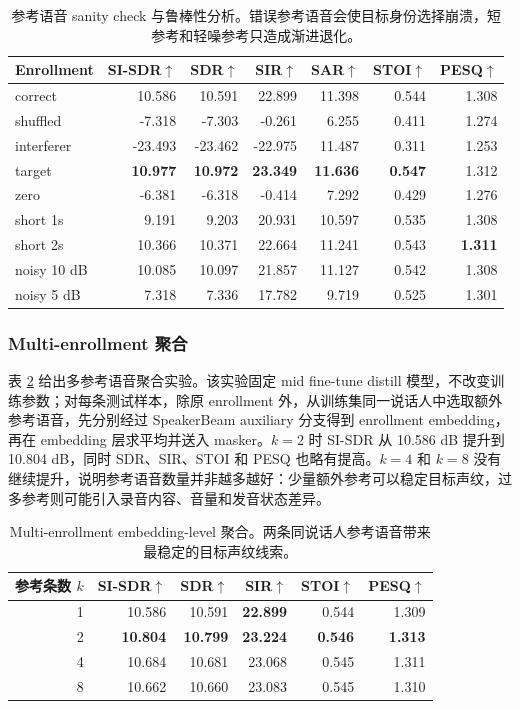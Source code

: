 \documentclass[UTF8,zihao=5,a4paper]{ctexart}
\newcommand{\sisdr}{SI-SDR}
\begin{document}
\begin{table}[H]
\centering
\begin{tabular}{lrrrrrr}
\toprule
Enrollment & \sisdr{}$\uparrow$ & SDR$\uparrow$ & SIR$\uparrow$ & SAR$\uparrow$ & STOI$\uparrow$ & PESQ$\uparrow$ \\
\midrule
correct & 10.586 & 10.591 & 22.899 & 11.398 & 0.544 & 1.308 \\
shuffled & -7.318 & -7.303 & -0.261 & 6.255 & 0.411 & 1.274 \\
interferer & -23.493 & -23.462 & -22.975 & 11.487 & 0.311 & 1.253 \\
target & \textbf{10.977} & \textbf{10.972} & \textbf{23.349} & \textbf{11.636} & \textbf{0.547} & 1.312 \\
zero & -6.381 & -6.318 & -0.414 & 7.292 & 0.429 & 1.276 \\
short 1s & 9.191 & 9.203 & 20.931 & 10.597 & 0.535 & 1.308 \\
short 2s & 10.366 & 10.371 & 22.664 & 11.241 & 0.543 & \textbf{1.311} \\
noisy 10 dB & 10.085 & 10.097 & 21.857 & 11.127 & 0.542 & 1.308 \\
noisy 5 dB & 7.318 & 7.336 & 17.782 & 9.719 & 0.525 & 1.301 \\
\bottomrule
\end{tabular}
\caption{参考语音 sanity check 与鲁棒性分析。错误参考语音会使目标身份选择崩溃，短参考和轻噪参考只造成渐进退化。}
\label{tab:enroll}
\end{table}

\subsubsection{Multi-enrollment 聚合}

表 \ref{tab:multi-enroll} 给出多参考语音聚合实验。该实验固定 mid fine-tune distill 模型，不改变训练参数；对每条测试样本，除原 enrollment 外，从训练集同一说话人中选取额外参考语音，先分别经过 SpeakerBeam auxiliary 分支得到 enrollment embedding，再在 embedding 层求平均并送入 masker。$k=2$ 时 \sisdr{} 从 10.586 dB 提升到 10.804 dB，同时 SDR、SIR、STOI 和 PESQ 也略有提高。$k=4$ 和 $k=8$ 没有继续提升，说明参考语音数量并非越多越好：少量额外参考可以稳定目标声纹，过多参考则可能引入录音内容、音量和发音状态差异。

\begin{table}[H]
\centering
\begin{tabular}{rrrrrr}
\toprule
参考条数 $k$ & \sisdr{}$\uparrow$ & SDR$\uparrow$ & SIR$\uparrow$ & STOI$\uparrow$ & PESQ$\uparrow$ \\
\midrule
1 & 10.586 & 10.591 & \textbf{22.899} & 0.544 & 1.309 \\
2 & \textbf{10.804} & \textbf{10.799} & \textbf{23.224} & \textbf{0.546} & \textbf{1.313} \\
4 & 10.684 & 10.681 & 23.068 & 0.545 & 1.311 \\
8 & 10.662 & 10.660 & 23.083 & 0.545 & 1.310 \\
\bottomrule
\end{tabular}
\caption{Multi-enrollment embedding-level 聚合。两条同说话人参考语音带来最稳定的目标声纹线索。}
\label{tab:multi-enroll}
\end{table}
\end{document}
